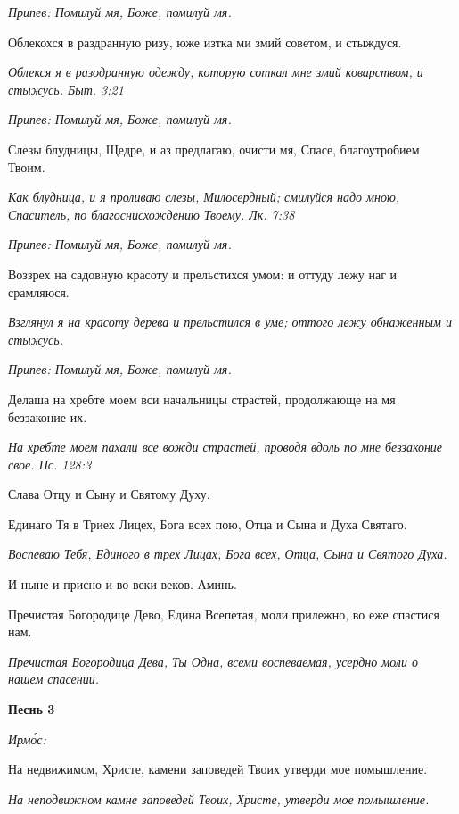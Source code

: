\itshape Припев:\normalfont{} Помилуй мя, Боже, помилуй мя.


Облекохся в раздранную ризу, юже изтка ми змий советом, и стыждуся.


\itshape Облекся я в разодранную одежду, которую соткал мне змий коварством, и стыжусь. Быт. 3:21\normalfont{}


\itshape Припев:\normalfont{} Помилуй мя, Боже, помилуй мя.


Слезы блудницы, Щедре, и аз предлагаю, очисти мя, Спасе, благоутробием Твоим.


\itshape Как блудница, и я проливаю слезы, Милосердный; смилуйся надо мною, Спаситель, по благоснисхождению Твоему. Лк. 7:38\normalfont{}


\itshape Припев:\normalfont{} Помилуй мя, Боже, помилуй мя.


Воззрех на садовную красоту и прельстихся умом: и оттуду лежу наг и срамляюся.


\itshape Взглянул я на красоту дерева и прельстился в уме; оттого лежу обнаженным и стыжусь.\normalfont{}


\itshape Припев:\normalfont{} Помилуй мя, Боже, помилуй мя.


Делаша на хребте моем вси начальницы страстей, продолжающе на мя беззаконие их.


\itshape На хребте моем пахали все вожди страстей, проводя вдоль по мне беззаконие свое. Пс. 128:3\normalfont{}


Слава Отцу и Сыну и Святому Духу.


Единаго Тя в Триех Лицех, Бога всех пою, Отца и Сына и Духа Святаго.


\itshape Воспеваю Тебя, Единого в трех Лицах, Бога всех, Отца, Сына и Святого Духа.\normalfont{}


И ныне и присно и во веки веков. Аминь.


Пречистая Богородице Дево, Едина Всепетая, моли прилежно, во еже спастися нам.


\itshape Пречистая Богородица Дева, Ты Одна, всеми воспеваемая, усердно моли о нашем спасении.\normalfont{}





\bfseries Песнь 3\normalfont{}


\itshape Ирмо́с:\normalfont{}


На недвижимом, Христе, камени заповедей Твоих утверди мое помышление.


\itshape На неподвижном камне заповедей Твоих, Христе, утверди мое помышление.\normalfont{}



